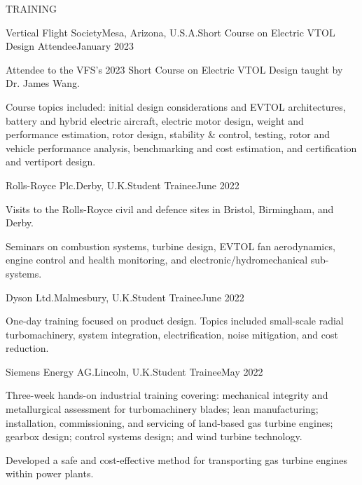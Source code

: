 \documentclass{resume} %
\begin{document}
\begin{rSection}{TRAINING}


\begin{rSubsection}
    {Vertical Flight Society}{Mesa, Arizona, U.S.A.}{Short Course on Electric VTOL Design Attendee}{January 2023}
    \item Attendee to the VFS's 2023 Short Course on Electric VTOL Design taught by Dr. James Wang. 
    \item Course topics included: initial design considerations and EVTOL architectures, battery and hybrid electric aircraft, electric motor design, weight and performance estimation, rotor design, stability \& control, testing, rotor and vehicle performance analysis, benchmarking and cost estimation, and certification and vertiport design.
\end{rSubsection}

\begin{rSubsection}
    {Rolls-Royce Plc.}{Derby, U.K.}{Student Trainee}{June 2022}
    \item Visits to the Rolls-Royce civil and defence sites in Bristol, Birmingham, and Derby. 
    \item Seminars on combustion systems, turbine design, EVTOL fan aerodynamics, engine control and health monitoring, and electronic/hydromechanical sub-systems.
\end{rSubsection}

\begin{rSubsection}
    {Dyson Ltd.}{Malmesbury, U.K.}{Student Trainee}{June 2022}
    \item One-day training focused on product design. Topics included small-scale radial turbomachinery, system integration, electrification, noise mitigation, and cost reduction.
\end{rSubsection}


\begin{rSubsection}
    {Siemens Energy AG.}{Lincoln, U.K.}{Student Trainee}{May 2022}
\item Three-week hands-on industrial training covering:  mechanical integrity and metallurgical assessment for turbomachinery blades; lean manufacturing; installation, commissioning, and servicing of land-based gas turbine engines; gearbox design; control systems design; and wind turbine technology.
\item Developed a safe and cost-effective method for transporting gas turbine engines within power plants. 
\end{rSubsection}



\end{rSection}
\end{document}
